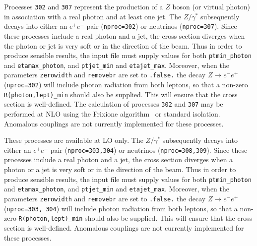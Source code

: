 \label{subsec:zgammajet}
Processes {\tt 302} and {\tt 307} represent the production of a $Z$ boson (or virtual photon)
in association with a real photon and at least one jet. 
The $Z/\gamma^*$ subsequently decays into 
either an $e^+ e^-$ pair ({\tt nproc=302}) or neutrinos ({\tt nproc=307}).
Since these processes include a real photon and a jet, the cross section diverges
when the photon or jet is very soft or in the direction of the beam.
Thus in order to produce sensible results, the input file must supply values for both
{\tt ptmin\_photon} and {\tt etamax\_photon}, and {\tt ptjet\_min} and {\tt etajet\_max}.
 Moreover, when the parameters {\tt zerowidth}
and {\tt removebr} are set to {\tt .false.} the decay $Z \to e^- e^+$ ({\tt nproc=302})
will include photon radiation from both leptons, so that a non-zero {\tt R(photon,lept)\_min}
should also be supplied. This will ensure that the cross section is well-defined.
The calculation of processes {\tt 302} and {\tt 307} may be performed
at NLO using the Frixione algorithm~\cite{Frixione:1998jh} or standard isolation. 
Anomalous couplings are not currently implemented for these processes. 



These processes are available at LO only. The $Z/\gamma^*$ subsequently decays into 
either an $e^+ e^-$ pair ({\tt nproc=303,304}) or neutrinos ({\tt nproc=308,309}). 
Since these processes include a real photon and a jet, the cross section diverges
when a photon or a jet is very soft or in the direction of the beam.
Thus in order to produce sensible results, the input file must supply values for both
{\tt ptmin\_photon} and {\tt etamax\_photon}, and {\tt ptjet\_min} and {\tt etajet\_max}.
 Moreover, when the parameters {\tt zerowidth}
and {\tt removebr} are set to {\tt .false.} the decay $Z \to e^- e^+$ ({\tt nproc=303, 304})
will include photon radiation from both leptons, so that a non-zero {\tt R(photon,lept)\_min}
should also be supplied. This will ensure that the cross section is well-defined.
Anomalous couplings are not currently implemented for these processes. 





